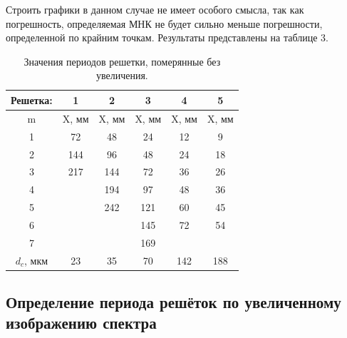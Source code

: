 \documentclass[a4paper, 14pt]{extarticle}%
\newcommand\ECaption[1]{%
     \captionsetup{font=footnotesize}%
     \caption{#1}}
\begin{document}
Строить графики в данном случае не имеет особого смысла, так как погрешность, определяемая МНК не будет сильно меньше погрешности, определенной по крайним точкам. Результаты представлены на таблице 3.
\newpage
\begin{table}[h!]
\begin{center}
\begin{tabular}{|c|c|c|c|c|c|}
\hline
\rowcolor[HTML]{00D2CB} 
Решетка:   & 1                        & 2                        & 3     & 4                        & 5                        \\ \hline
\rowcolor[HTML]{9698ED} 
m          & X, мм                    & X, мм                    & X, мм & X, мм                    & X, мм                    \\ \hline
1          & 72                       & 48                       & 24    & 12                       & 9                        \\ \hline
\rowcolor[HTML]{9698ED} 
2          & 144                      & 96                       & 48    & 24                       & 18                       \\ \hline
3          & 217                      & 144                      & 72    & 36                       & 26                       \\ \hline
\rowcolor[HTML]{9698ED} 
4          & \cellcolor[HTML]{DAE8FC} & 194                      & 97    & 48                       & 36                       \\ \hline
5          & \cellcolor[HTML]{DAE8FC} & 242                      & 121   & 60                       & 45                       \\ \hline
\rowcolor[HTML]{9698ED} 
6          & \cellcolor[HTML]{DAE8FC} & \cellcolor[HTML]{DAE8FC} & 145   & 72                       & 54                       \\ \hline
7          & \cellcolor[HTML]{DAE8FC} & \cellcolor[HTML]{DAE8FC} & 169   & \cellcolor[HTML]{DAE8FC} & \cellcolor[HTML]{DAE8FC} \\ \hline
\rowcolor[HTML]{00D2CB} 
$d_c$, мкм & 23                       & 35                       & 70    & 142                      & 188                      \\ \hline
\end{tabular}
\ECaption{Значения периодов решетки, померянные без увеличения.}
\end{center}
\end{table}

\subsection*{Определение периода решёток по увеличенному изображению спектра}
\end{document}
